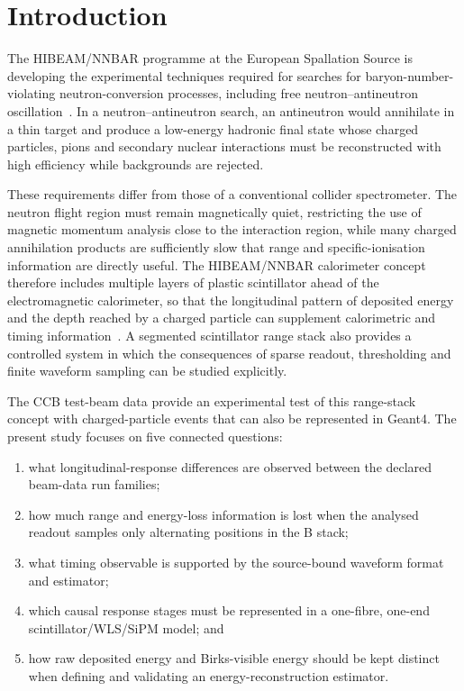 \section{Introduction}

The HIBEAM/NNBAR programme at the European Spallation Source is developing the experimental techniques required for searches for baryon-number-violating neutron-conversion processes, including free neutron--antineutron oscillation~\cite{Yiu2022,Barrow2021}. In a neutron--antineutron search, an antineutron would annihilate in a thin target and produce a low-energy hadronic final state whose charged particles, pions and secondary nuclear interactions must be reconstructed with high efficiency while backgrounds are rejected.

These requirements differ from those of a conventional collider spectrometer. The neutron flight region must remain magnetically quiet, restricting the use of magnetic momentum analysis close to the interaction region, while many charged annihilation products are sufficiently slow that range and specific-ionisation information are directly useful. The HIBEAM/NNBAR calorimeter concept therefore includes multiple layers of plastic scintillator ahead of the electromagnetic calorimeter, so that the longitudinal pattern of deposited energy and the depth reached by a charged particle can supplement calorimetric and timing information~\cite{Dunne2022}. A segmented scintillator range stack also provides a controlled system in which the consequences of sparse readout, thresholding and finite waveform sampling can be studied explicitly.

The CCB test-beam data provide an experimental test of this range-stack concept with charged-particle events that can also be represented in Geant4. The present study focuses on five connected questions:
\begin{enumerate}[label=(\roman*)]
  \item what longitudinal-response differences are observed between the declared beam-data run families;
  \item how much range and energy-loss information is lost when the analysed readout samples only alternating positions in the B stack;
  \item what timing observable is supported by the source-bound waveform format and estimator;
  \item which causal response stages must be represented in a one-fibre, one-end scintillator/WLS/SiPM model; and
  \item how raw deposited energy and Birks-visible energy should be kept distinct when defining and validating an energy-reconstruction estimator.
\end{enumerate}

